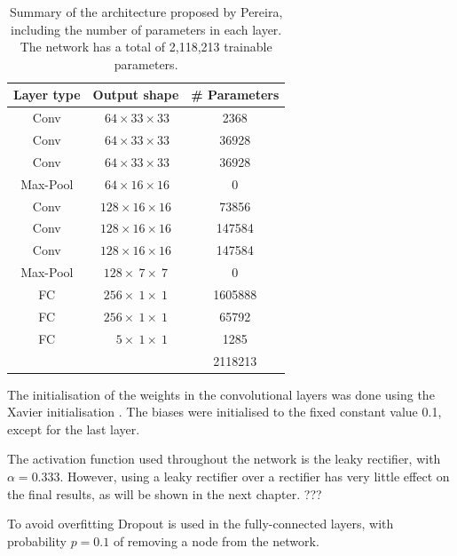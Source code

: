\documentclass[12pt,a4paper,twoside,openright]{report}
\begin{document}
\begin{table}
\centering	
\label{table:pereira_weights}
\begin{tabular}{ c c S[table-format=7.0] } 
\textbf{Layer type} & \textbf{Output shape} & \textbf{\# Parameters} \\
 \hline
 Conv 		& $\ 64 	\times 33 	\times 33$ 	& 2368 \\ 
 Conv 		& $\ 64 	\times 33 	\times 33$ 	& 36928 \\ 
 Conv 		& $\ 64 	\times 33 	\times 33$	& 36928 \\ 
Max-Pool 	& $\ 64 	\times 16 	\times 16$ 	& 0\\
 Conv 		& $128 		 \times 16 	\times 16$	& 73856 \\ 
 Conv 		& $128 		\times 16 	\times 16$ 	& 147584 \\ 
 Conv 		& $128 		\times 16 	\times 16$ 	& 147584 \\ 
Max-Pool 	& $128 		\times\ 7 	\times\ 7$	& 0\\
FC			& $256 		\times\ 1 	\times\ 1$	& 1605888\\
FC			& $256 		\times\ 1 	\times\ 1$	& 65792\\
FC			& $\quad 5 	\times\ 1 	\times\ 1$ 	& 1285\\
\hhline{~~=}
\rule{0pt}{3ex}    
&& 2118213\\
\end{tabular}
\caption[Summary of the architecture proposed by Pereira, including the number of parameters in each layer.]{Summary of the architecture proposed by Pereira, including the number of parameters in each layer. The network has a total of 2,118,213 trainable parameters.}
\end{table}


The initialisation of the weights in the convolutional layers was done using the Xavier initialisation \cite{xavier_init}. The biases were initialised to the fixed constant value 0.1, except for the last layer.

The activation function used throughout the network is the leaky rectifier, with  $\alpha = 0.333$. However, using a leaky rectifier over a rectifier has very little effect on the final results, as will be shown in the next chapter. ???

To avoid overfitting Dropout \cite{} is used in the fully-connected layers, with probability $p=0.1$ of removing a node from the network.
\end{document}
